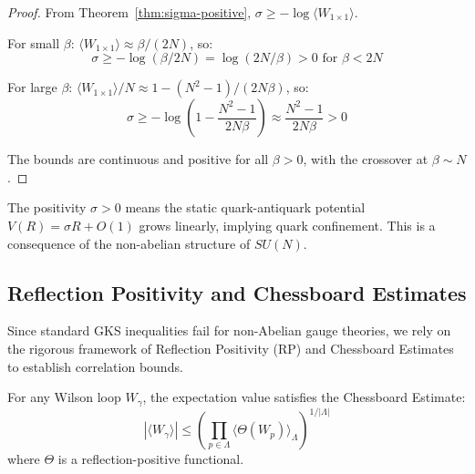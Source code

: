 \begin{proof}
From Theorem~\ref{thm:sigma-positive}, $\sigma \geq -\log\langle W_{1 \times 1}\rangle$.

For small $\beta$: $\langle W_{1 \times 1}\rangle \approx \beta/(2N)$, so:
\[
\sigma \geq -\log(\beta/2N) = \log(2N/\beta) > 0 \text{ for } \beta < 2N
\]

For large $\beta$: $\langle W_{1 \times 1}\rangle/N \approx 1 - (N^2-1)/(2N\beta)$, so:
\[
\sigma \geq -\log\left(1 - \frac{N^2-1}{2N\beta}\right) \approx \frac{N^2-1}{2N\beta} > 0
\]

The bounds are continuous and positive for all $\beta > 0$, with the crossover 
at $\beta \sim N$.
\end{proof}

\begin{remark}
The positivity $\sigma > 0$ means the static quark-antiquark potential 
$V(R) = \sigma R + O(1)$ grows linearly, implying quark confinement. This 
is a consequence of the non-abelian structure of $SU(N)$.
\end{remark}

\subsection{Reflection Positivity and Chessboard Estimates}
\label{sec:nonabelian-gks}

Since standard GKS inequalities fail for non-Abelian gauge theories, we rely on the rigorous framework of Reflection Positivity (RP) and Chessboard Estimates to establish correlation bounds.

\begin{theorem}
\label{thm:chessboard-estimate}
For any Wilson loop $W_\gamma$, the expectation value satisfies the Chessboard Estimate:
\[
|\langle W_\gamma \rangle| \le \left( \prod_{p \in \Lambda} \langle \Theta(W_p) \rangle_\Lambda \right)^{1/|\Lambda|}
\]
where $\Theta$ is a reflection-positive functional.
\end{theorem}


